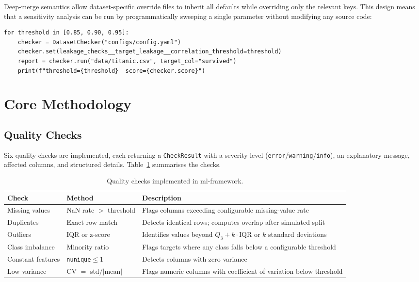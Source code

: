 \documentclass[12pt,a4paper]{report}
\newcommand{\tblhead}{\rowcolor{tblHeadBg}\color{white}\bfseries}
\begin{document}
Deep-merge semantics allow dataset-specific override files to inherit all defaults while
overriding only the relevant keys.  This design means that a sensitivity analysis can be
run by programmatically sweeping a single parameter without modifying any source code:

\begin{lstlisting}[caption={Programmatic parameter sweep via the SDK.}]
for threshold in [0.85, 0.90, 0.95]:
    checker = DatasetChecker("configs/config.yaml")
    checker.set(leakage_checks__target_leakage__correlation_threshold=threshold)
    report = checker.run("data/titanic.csv", target_col="survived")
    print(f"threshold={threshold}  score={checker.score}")
\end{lstlisting}

\section{Core Methodology}
\label{sec:methodology}

\subsection{Quality Checks}

Six quality checks are implemented, each returning a \texttt{CheckResult} with a severity
level (\texttt{error}/\texttt{warning}/\texttt{info}), an explanatory message, affected
columns, and structured details.  Table~\ref{tab:quality} summarises the checks.

\begin{table}[!ht]
\centering
\caption{Quality checks implemented in ml-framework.}
\label{tab:quality}
\scriptsize
{}
\begin{tabularx}{\textwidth}{llX}
\toprule
\tblhead \textbf{Check} & \textbf{Method} & \textbf{Description} \\
\midrule
Missing values & NaN rate $>$ threshold & Flags columns exceeding configurable missing-value rate \\
Duplicates     & Exact row match       & Detects identical rows; computes overlap after simulated split \\
Outliers       & IQR or z-score        & Identifies values beyond $Q_3+k\cdot\text{IQR}$ or $k$ standard deviations \\
Class imbalance & Minority ratio        & Flags targets where any class falls below a configurable threshold \\
Constant features & \texttt{nunique}$\le1$ & Detects columns with zero variance \\
Low variance   & CV $=$ std$/|$mean$|$  & Flags numeric columns with coefficient of variation below threshold \\
\bottomrule
\end{tabularx}
\end{table}
\end{document}
